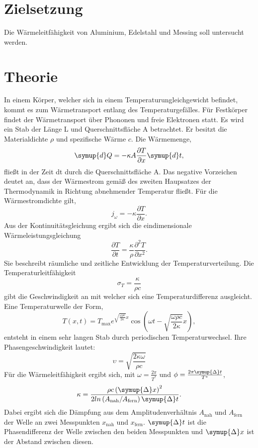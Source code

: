 \section{Zielsetzung}
Die Wärmeleitfähigkeit von Aluminium, Edelstahl und Messing soll untersucht werden.
\section{Theorie}
\label{sec:Theorie}
In einem Körper, welcher sich in einem Temperaturungleichgewicht befindet, kommt es zum Wärmetransport entlang des Temperaturgefälles.
Für Festkörper findet der Wärmetransport über Phononen und freie Elektronen statt.
Es wird ein Stab der Länge L und Querschnittsfläche A betrachtet.
Er besitzt die Materialdichte $\rho$ und spezifische Wärme $c$.
Die Wärmemenge,
\begin{equation}
  \label{eqn:gl1}
    \symup{d}Q =-  \kappa A \frac{\partial T}{\partial x} \symup{d}t,
\end{equation}
fließt in der Zeit dt durch die Querschnittsfläche A.
Das negative Vorzeichen deutet an, dass der Wärmestrom gemäß des zweiten Haupsatzes der
Thermodynamik in Richtung abnehmender Temperatur fließt.
Für die Wärmestromdichte gilt,
\begin{equation}
    j_\omega =- \kappa \frac{\partial T}{\partial x}.
\end{equation}
Aus der Kontinuitätsgleichung ergibt sich die eindimensionale Wärmeleistungsgleichung
\begin{equation}
    \frac{\partial T}{\partial t} = \frac {\kappa}{\rho} \frac{\partial^2  T}{\partial x^2}.
\end{equation}
Sie beschreibt räumliche und zeitliche Entwicklung der Temperaturverteilung.
Die Temperaturleitfähigkeit
\begin{equation}
    \sigma_T = \frac{\kappa}{\rho c}
\end{equation}
gibt die Geschwindigkeit an mit welcher sich eine Temperaturdifferenz ausgleicht.
%
Eine Temperaturwelle der Form,
\begin{equation}
    T\left(x,t\right) = T_\text{max}e^{\sqrt{\frac{\omega\rho c}{2 \kappa}}x} \cos\left(\omega t - \sqrt{\frac{\omega\rho c}{2 \kappa}}x\right),
\label{eqn:thermowelle}
\end{equation}
entsteht in einem sehr langen Stab durch periodischen Temperaturwechsel.
Ihre Phasengeschwindigkeit lautet:
\begin{equation}
    \upsilon = \sqrt{\frac{2\kappa\omega}{\rho c}}
\end{equation}
Für die Wärmeleitfähigkeit ergibt sich, mit  $\omega=\frac{2\pi}{T^*}$ und $\phi=\frac{2\pi\symup{\Delta}t}{T^*}$,
\begin{equation}
    \kappa = \frac{\rho c\left(\symup{\Delta}x\right)^2}{2 ln\left(A_\text{nah}/A_\text{fern}\right)\symup{\Delta}t}.
    \label{eqn:wleitfaehigkeit}
\end{equation}
Dabei ergibt sich die Dämpfung aus dem Amplitudenverhältnis $A_\text{nah}$ und $A_\text{fern}$ der Welle an zwei Messpunkten
$x_\text{nah}$ und $x_\text{fern}$.
$\symup{\Delta}t$ ist die Phasendifferenz der Welle zwischen den beiden Messpunkten und $\symup{\Delta}x$ ist der Abstand zwischen
diesen.
